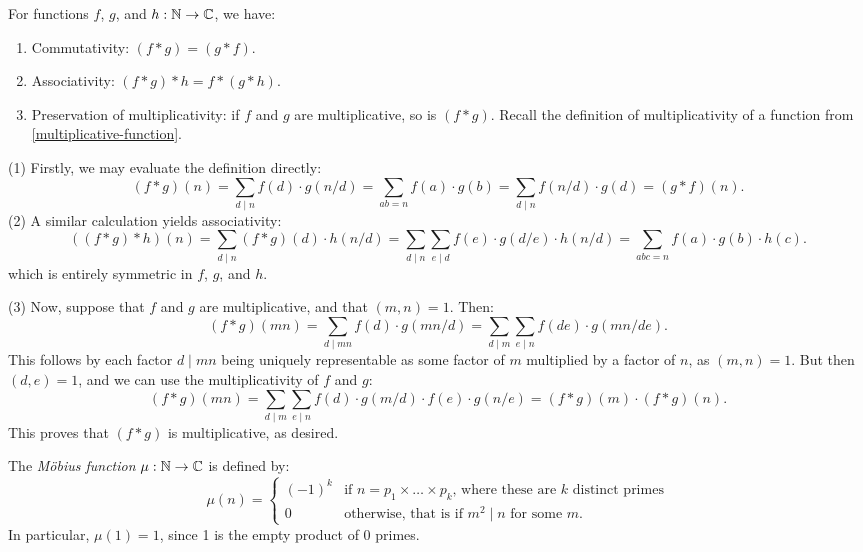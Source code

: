 \documentclass{article}
\begin{document}
\begin{proposition}
	\label{dirichlet-convolution-multiplicativity}
    For functions $f$, $g$, and $h : \mathbb{N} \to \mathbb{C}$, we have:
    \begin{enumerate}
    	\item Commutativity: $(f * g) = (g * f)$.
    	\item Associativity: $(f * g) * h = f * (g * h)$.
    	\item Preservation of multiplicativity: if $f$ and $g$ are multiplicative, so is $(f * g)$. Recall the definition of multiplicativity of a function from \ref{multiplicative-function}.
	\end{enumerate}
\end{proposition}

\begin{prf}
    (1) Firstly, we may evaluate the definition directly:
    \[
	(f * g)(n) = \sum_{d \mid n} f(d) \cdot g(n/d) =
	\sum_{ab = n} f(a) \cdot g(b) = \sum_{d \mid n} f(n/d) \cdot g(d) = (g * f)(n).
	\]
	(2) A similar calculation yields associativity:
	\[
	((f * g) * h)(n) = \sum_{d \mid n} (f * g)(d) \cdot h(n/d)
	= \sum_{d \mid n} \sum_{e \mid d} f(e) \cdot g(d/e) \cdot h(n/d)
	= \sum_{abc = n} f(a) \cdot g(b) \cdot h(c).
	\]
	which is entirely symmetric in $f$, $g$, and $h$.
	
	(3) Now, suppose that $f$ and $g$ are multiplicative, and that $(m, n) = 1$. Then:
	\[
	(f * g)(mn) = \sum_{d \mid mn} f(d) \cdot g(mn/d)
	= \sum_{d \mid m} \sum_{e \mid n} f(de) \cdot g(mn/de).
	\]
	This follows by each factor $d \mid mn$ being uniquely representable as some factor of $m$ multiplied by a factor of $n$, as $(m, n) = 1$. But then $(d, e) = 1$, and we can use the multiplicativity of $f$ and $g$:
	\[
	(f * g)(mn) =
	\sum_{d \mid m} \sum_{e \mid n} f(d) \cdot g(m/d) \cdot f(e) \cdot g(n/e)
	= (f * g)(m) \cdot (f * g)(n).
	\]
	This proves that $(f * g)$ is multiplicative, as desired.
\end{prf}

\begin{definition}
    The \textit{M\"obius function} $\mu : \mathbb{N} \to \mathbb{C}$ is defined by:
    \[
	\mu(n) = \begin{cases}
		(-1)^k & \text{if $n = p_1 \times \dots \times p_k$, where these are $k$ distinct primes} \\
		0 & \text{otherwise, that is if $m^2 \mid n$ for some $m$.}
	\end{cases}
	\]
	In particular, $\mu(1) = 1$, since 1 is the empty product of 0 primes.
\end{definition}
\end{document}
